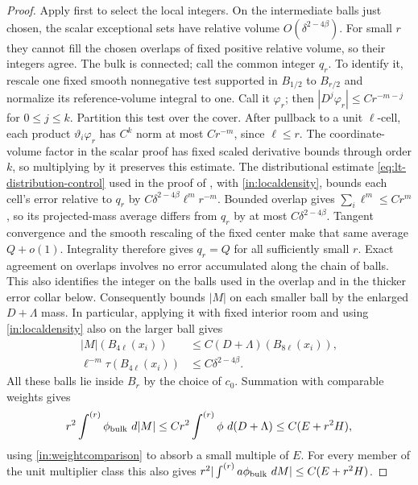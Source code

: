 \begin{proof}
Apply  first to select the local integers.  On the
intermediate balls just chosen, the scalar exceptional sets have relative
volume $O(\delta^{2-4\beta})$.  For small $r$ they cannot fill the
chosen overlaps of fixed positive relative volume, so their integers
agree.  The bulk is connected; call
the common integer $q_r$.  To identify it, rescale one fixed smooth
nonnegative test supported in $B_{1/2}$ to $B_{r/2}$ and normalize
its reference-volume integral to one.  Call it $\varphi_r$; then
$|D^j\varphi_r|\leq Cr^{-m-j}$ for $0\leq j\leq k$.  Partition this test
over the cover.  After pullback to a unit $\ell$-cell, each product
$\vartheta_i\varphi_r$ has $C^k$ norm at most $Cr^{-m}$, since
$\ell\leq r$.  The coordinate-volume factor in the scalar proof has
fixed scaled derivative bounds through order $k$, so multiplying by it
preserves this estimate.  The distributional estimate
\eqref{eq:lt-distribution-control} used in the proof of , with
\eqref{in:localdensity}, bounds each cell's error relative to $q_r$ by
$C\delta^{2-4\beta}\ell^m r^{-m}$.  Bounded overlap gives
$\sum_i\ell^m\leq Cr^m$, so its projected-mass average differs from
$q_r$ by at most $C\delta^{2-4\beta}$.  Tangent convergence and
the smooth rescaling of the fixed center make that same average
$Q+o(1)$.  Integrality therefore gives $q_r=Q$ for all sufficiently
small $r$.  Exact agreement on overlaps involves no error accumulated
along the chain of balls.  This also identifies the integer on the
balls used in the overlap and in the thicker error collar below.
Consequently  bounds $|M|$ on each smaller ball by the
enlarged $D+\Lambda$ mass.  In particular, applying it with fixed
interior room and using \eqref{in:localdensity} also on the larger
ball gives
\begin{equation}\label{in:localscalar}
 \begin{split}
 |M|(B_{4\ell}(x_i))
   &\leq C(D+\Lambda)(B_{8\ell}(x_i)),\\
 \ell^{-m}\tau(B_{4\ell}(x_i))
   &\leq C\delta^{2-4\beta}.
 \end{split}
\end{equation}
All these balls lie inside $B_r$ by the choice of $c_0$.
Summation with comparable weights gives
\begin{equation}\label{in:bulkvariation}
 r^2\int^{(r)}\phi_{\rm bulk}\,\mathop{}\!d|M|
       \leq Cr^2\int^{(r)}\phi\,\mathop{}\!d(D+\Lambda)
       \leq C(E+r^2H),
\end{equation}
using \eqref{in:weightcomparison} to absorb a small multiple of $E$.
For every member of the unit multiplier class this also gives
$r^2|\int^{(r)}a\phi_{\rm bulk}\,\mathop{}\!d M|\leq C(E+r^2H)$.


\end{proof}
